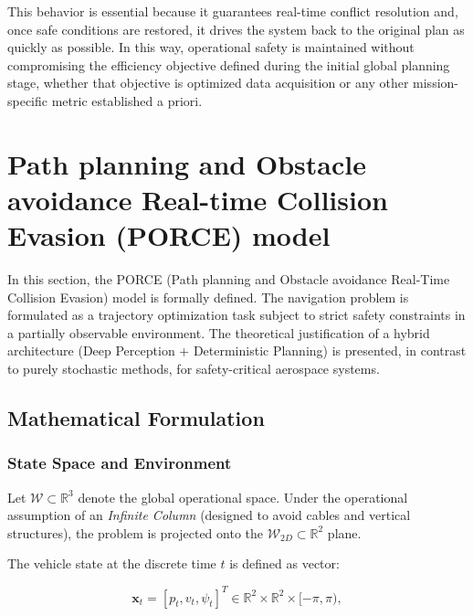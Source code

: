 \documentclass[a4paper, 11pt]{article}
\begin{document}
This behavior is essential because it guarantees real-time conflict resolution and, once safe conditions are restored, it drives the system back to the original plan as quickly as possible. In this way, operational safety is maintained without compromising the efficiency objective defined during the initial global planning stage, whether that objective is optimized data acquisition or any other mission-specific metric established a priori.











\section{Path planning and Obstacle avoidance Real-time Collision Evasion (PORCE) model}

In this section, the PORCE (Path planning and Obstacle avoidance Real-Time Collision Evasion) model is formally defined. The navigation problem is formulated as a trajectory optimization task subject to strict safety constraints in a partially observable environment. The theoretical justification of a hybrid architecture (Deep Perception + Deterministic Planning) is presented, in contrast to purely stochastic methods, for safety-critical aerospace systems.

\subsection{Mathematical Formulation}
\subsubsection{State Space and Environment}

Let $\mathcal{W} \subset \mathbb{R}^3$ denote the global operational space. Under the operational assumption of an \textit{Infinite Column} (designed to avoid cables and vertical structures), the problem is projected onto the $\mathcal{W}_{2D} \subset \mathbb{R}^2$ plane.

The vehicle state at the discrete time $t$ is defined as vector: 

\begin{equation}
    \mathbf{x}_t = [p_t, v_t, \psi_t]^T \in \mathbb{R}^2 \times \mathbb{R}^2 \times [-\pi, \pi),
\end{equation}
\end{document}
